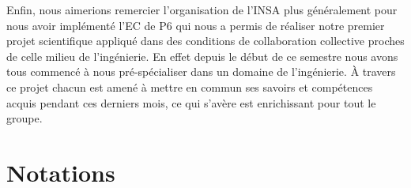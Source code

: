 \documentclass[a4paper, 12pt]{report} %
\begin{document}
\indent Enfin, nous aimerions remercier l'organisation de 
l'INSA plus généralement pour nous avoir implémenté l'EC de P6
qui nous a permis de réaliser notre premier projet
scientifique appliqué dans des conditions de collaboration
collective proches de celle milieu de l'ingénierie. 
En effet depuis le début de ce semestre nous avons tous commencé à 
nous pré-spécialiser dans un domaine de l'ingénierie. À travers 
ce projet chacun est amené à mettre en commun ses savoirs et 
compétences acquis pendant ces derniers mois, ce qui s'avère est 
enrichissant pour tout le groupe.

\vfill


\newpage
\pagestyle{courant} 
	\setcounter{tocdepth}{2} %
	\tableofcontents %


\newpage
\chapter*{Notations} 
\end{document}

